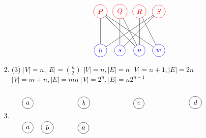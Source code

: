 \documentclass[12pt, A4]{article}
\newcommand{\enumset}[1]{\setcounter{enumi}{#1}}
\begin{document}
\begin{enumerate}
\begin{tasks}
						\task
							\[\begin{tikzpicture}
								\node[circle, draw, blue] (h) at (0, 0) {\(h\)};
								\node[circle, draw, blue] (s) at (1, 0) {\(s\)};
								\node[circle, draw, blue] (n) at (2, 0) {\(n\)};
								\node[circle, draw, blue] (w) at (3, 0) {\(w\)};
								\node[circle, draw, red] (P) at (0, 2) {\(P\)};
								\node[circle, draw, red] (Q) at (1, 2) {\(Q\)};
								\node[circle, draw, red] (R) at (2, 2) {\(R\)};
								\node[circle, draw, red] (S) at (3, 2) {\(S\)};
								\draw (P) -- (h);
								\draw (P) -- (n);
								\draw (P) -- (w);
								\draw (Q) -- (s);
								\draw (Q) -- (n);
								\draw (R) -- (n);
								\draw (R) -- (w);
								\draw (S) -- (h);
								\draw (S) -- (s);
							\end{tikzpicture}\]
					\end{tasks}
				\enumset{36}
				\item
					\begin{tasks}(3)
						\task
							\(|V| = n, |E| = \binom{n}{2}\)
						\task
							\(|V| = n, |E| = n\)
						\task
							\(|V| = n + 1, |E| = 2n\)
						\task
							\(|V| = m + n, |E| = mn\)
						\task
							\(|V| = 2^n, |E| = n2^{n - 1}\)
					\end{tasks}
				\enumset{52}
				\item
					\[\def\arraystretch{3}\begin{tabular}{*{4}{p{0.2\textwidth}}}
							\begin{tikzpicture}
								\node[circle, draw] (a) at (0, 1) {\(a\)};
							\end{tikzpicture}
						&
							\begin{tikzpicture}
								\node[circle, draw] (b) at (1, 1) {\(b\)};
							\end{tikzpicture}
						&
							\begin{tikzpicture}
								\node[circle, draw] (c) at (0, 0) {\(c\)};
							\end{tikzpicture}
						&
							\begin{tikzpicture}
								\node[circle, draw] (d) at (1, 0) {\(d\)};
							\end{tikzpicture} 
						\\
							\begin{tikzpicture}
								\node[circle, draw] (a) at (0, 1) {\(a\)};
								\node[circle, draw] (b) at (1, 1) {\(b\)};
							\end{tikzpicture}
						&
							\begin{tikzpicture}
								\node[circle, draw] (a) at (0, 1) {\(a\)};

\end{tikzpicture}
\end{tabular}\]
\end{enumerate}
\end{document}
